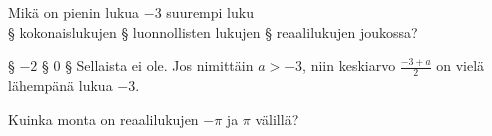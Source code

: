 \begin{tehtavasivu}
\begin{tehtava}%
\begin{vastaus}
\end{vastaus}
\end{tehtava}


\begin{tehtava}
Mikä on pienin lukua $-3$ suurempi luku \\
§ kokonaislukujen
§ luonnollisten lukujen
§ reaalilukujen joukossa?
\begin{vastaus}
§ $-2$
§ $0$
§ Sellaista ei ole. Jos nimittäin $a > -3$, niin keskiarvo
$\frac{-3+a}{2}$ on vielä lähempänä lukua $-3$. 
\end{vastaus}
\end{tehtava}

\begin{tehtava}
Kuinka monta 
on reaalilukujen \(-\pi\) ja \(\pi\) välillä?
\begin{vastaus}
\end{vastaus}
\end{tehtava}


\end{tehtavasivu}

